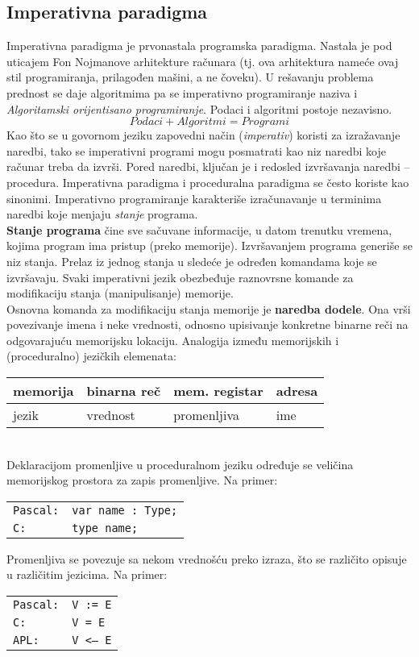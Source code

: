 \documentclass[../main.tex]{subfiles}
\begin{document}
\begin{boxnaslovi}
\section{Imperativna paradigma}
\end{boxnaslovi}
Imperativna paradigma je prvonastala programska paradigma. Nastala je pod uticajem Fon Nojmanove arhitekture računara (tj. ova arhitektura nameće ovaj stil programiranja, prilagođen mašini, a ne čoveku). U rešavanju problema prednost se daje algoritmima pa se imperativno programiranje naziva i {\it Algoritamski orijentisano programiranje}. Podaci i algoritmi postoje nezavisno.
$$ Podaci + Algoritmi = Programi$$
Kao što se u govornom jeziku zapovedni način ({\it imperativ}) koristi za  izražavanje naredbi, tako se imperativni programi mogu posmatrati kao niz naredbi koje računar treba da izvrši. Pored naredbi, ključan je i redosled izvršavanja naredbi -- procedura. Imperativna paradigma i proceduralna paradigma se često koriste kao sinonimi. Imperativno programiranje karakteriše izračunavanje u terminima naredbi koje menjaju {\it stanje }programa.
\\
{\bf Stanje programa} čine sve sačuvane informacije, u datom trenutku vremena, kojima program ima pristup (preko memorije). Izvršavanjem programa generiše se niz stanja. Prelaz iz jednog stanja u sledeće je određen komandama koje se izvršavaju. Svaki imperativni jezik obezbeđuje raznovrsne komande za modifikaciju stanja (manipulisanje) memorije. 
\\
Osnovna komanda za modifikaciju stanja memorije je {\bf naredba dodele}. Ona vrši povezivanje imena i neke vrednosti, odnosno upisivanje konkretne binarne reči na odgovarajuću memorijsku lokaciju. Analogija između memorijskih i (proceduralno) jezičkih elemenata:\\
\begin{tabularx}{\textwidth/3*2}{XXXX}
memorija & binarna reč& mem. registar & adresa\\
\hline
jezik & vrednost& promenljiva& ime
\end{tabularx}
\\
Deklaracijom promenljive u proceduralnom jeziku određuje se veličina memorijskog prostora za zapis promenljive. Na primer:
\begin{center}
\begin{tabular}{ll}
\texttt{Pascal:} & \texttt{var name : Type;} \\
\texttt{C:} & \texttt{type name;} 
\end{tabular}
\end{center}
\pagebreak
Promenljiva se povezuje sa nekom vrednošću preko izraza, što se različito opisuje u različitim jezicima. Na primer:
\begin{center}
\begin{tabular}{ll}
\texttt{Pascal:} & \texttt{V := E} \\
 \texttt{C:} & \texttt{V = E}  \\
\texttt{APL:} & \texttt{V <-- E} 
\end{tabular}
\end{center}
\end{document}
